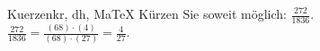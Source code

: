 \begin{MAufgabe}{Kuerzen}{kr, dh, MaTeX}
K\"urzen Sie soweit m\"oglich: $\frac{272}{1836}$.\\ 
\ifLsg\MLoesung
\quad $\frac{272}{1836}=\frac{(68)\cdot(4)}{(68)\cdot(27)}=\frac{4}{27}$.\else\relax\fi
 \end{MAufgabe}